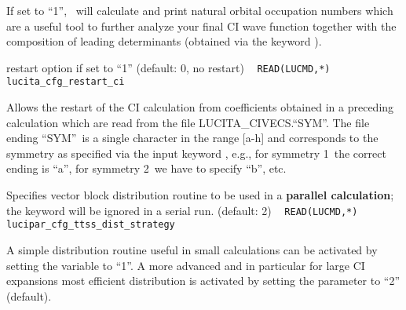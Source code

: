 \begin{description}
If set to ``1'', \lucita\ will calculate and print natural orbital occupation numbers which are a useful tool to further analyze 
your final CI wave function together with the composition of leading determinants (obtained via the keyword ).

\item[\Key{RSTART}] restart option if set to ``1'' (default: 0, no restart) \verb| |\newline
\verb|READ(LUCMD,*) lucita_cfg_restart_ci |

Allows the restart of the CI calculation from coefficients obtained 
in a preceding calculation which are read from the file LUCITA\_CIVECS.``SYM''. 
The file ending ``SYM''\ is a single character in the range [a-h] and 
corresponds to the symmetry as specified via the input keyword , e.g., 
for symmetry 1\ the correct ending is ``a'', for symmetry 2\ we have to specify ``b'', etc.

\item[\Key{DISTRT}] Specifies vector block distribution routine to be used in a {\bf{parallel calculation}}; the keyword will be ignored in a serial run. (default: 2) \verb| |\newline
\verb|READ(LUCMD,*) lucipar_cfg_ttss_dist_strategy |

A simple distribution routine useful in small calculations 
can be activated by setting the variable to ``1''. A more advanced and in particular for large CI expansions most 
efficient distribution is activated by setting the parameter to ``2'' (default).

\end{description}
